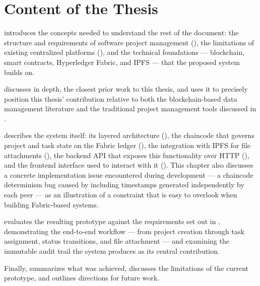 \section{Content of the Thesis}
\label{sec:content}

 introduces the concepts needed to understand the rest of the document: the structure and requirements of software project management (), the limitations of existing centralized platforms (), and the technical foundations — blockchain, smart contracts, Hyperledger Fabric, and IPFS — that the proposed system builds on.

 discusses \textcite{adel2023} in depth, the closest prior work to this thesis, and uses it to precisely position this thesis' contribution relative to both the blockchain-based data management literature and the traditional project management tools discussed in .

 describes the system itself: its layered architecture (), the chaincode that governs project and task state on the Fabric ledger (), the integration with IPFS for file attachments (), the backend API that exposes this functionality over HTTP (), and the frontend interface used to interact with it (). This chapter also discusses a concrete implementation issue encountered during development — a chaincode determinism bug caused by including timestamps generated independently by each peer — as an illustration of a constraint that is easy to overlook when building Fabric-based systems.

 evaluates the resulting prototype against the requirements set out in , demonstrating the end-to-end workflow — from project creation through task assignment, status transitions, and file attachment — and examining the immutable audit trail the system produces as its central contribution.

Finally,  summarizes what was achieved, discusses the limitations of the current prototype, and outlines directions for future work.
